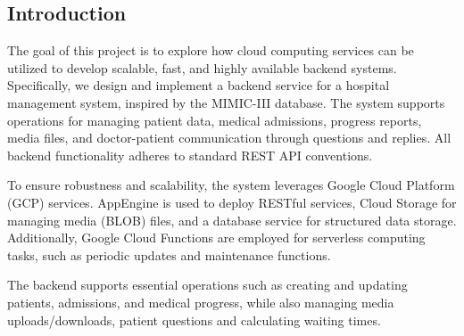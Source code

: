 \begin{multicols}{2}
\tableofcontents
\section{Introduction}
The goal of this project is to explore how cloud computing services can be utilized to develop scalable, fast, and highly available backend systems. Specifically, we design and implement a backend service for a hospital management system, inspired by the MIMIC-III database. The system supports operations for managing patient data, medical admissions, progress reports, media files, and doctor-patient communication through questions and replies. All backend functionality adheres to standard REST API conventions.

To ensure robustness and scalability, the system leverages Google Cloud Platform (GCP) services. AppEngine is used to deploy RESTful services, Cloud Storage for managing media (BLOB) files, and a database service for structured data storage. Additionally, Google Cloud Functions are employed for serverless computing tasks, such as periodic updates and maintenance functions. 

The backend supports essential operations such as creating and updating patients, admissions, and medical progress, while also managing media uploads/downloads, patient questions and calculating waiting times.

\end{multicols}